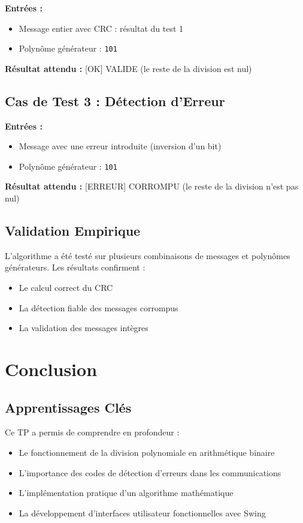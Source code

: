 \documentclass[12pt, a4paper]{article}
\begin{document}
\textbf{Entrées :}
\begin{itemize}
    \item Message entier avec CRC : résultat du test 1
    \item Polynôme générateur : \texttt{101}
\end{itemize}

\textbf{Résultat attendu :} [OK] VALIDE (le reste de la division est nul)

\subsection{Cas de Test 3 : Détection d'Erreur}

\textbf{Entrées :}
\begin{itemize}
    \item Message avec une erreur introduite (inversion d'un bit)
    \item Polynôme générateur : \texttt{101}
\end{itemize}

\textbf{Résultat attendu :} [ERREUR] CORROMPU (le reste de la division n'est pas nul)

\subsection{Validation Empirique}

L'algorithme a été testé sur plusieurs combinaisons de messages et polynômes générateurs. Les résultats confirment :

\begin{itemize}
    \item Le calcul correct du CRC
    \item La détection fiable des messages corrompus
    \item La validation des messages intègres
\end{itemize}

\section{Conclusion}

\subsection{Apprentissages Clés}

Ce TP a permis de comprendre en profondeur :

\begin{itemize}
    \item Le fonctionnement de la division polynomiale en arithmétique binaire
    \item L'importance des codes de détection d'erreurs dans les communications
    \item L'implémentation pratique d'un algorithme mathématique
    \item La développement d'interfaces utilisateur fonctionnelles avec Swing
\end{itemize}
\end{document}
